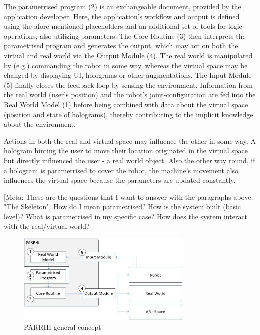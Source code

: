 The parametrised program (2) is an exchangeable document, provided by the application developer. Here, the application's workflow and output is defined using the afore mentioned placeholders and an additional set of tools for logic operations, also utilizing parameters. The Core Routine (3) then interprets the parametrised program and generates the output, which may act on both the virtual and real world via the Output Module (4). The real world is manipulated by (e.g.) commanding the robot in some way, whereas the virtual space may be changed by displaying UI, holograms or other augmentations. The Input Module (5) finally closes the feedback loop by sensing the environment. Information from the real world (user's position) and the robot's joint-configuration are fed into the Real World Model (1) before being combined with data about the virtual space (position and state of holograms), thereby contributing to the implicit knowledge about the environment.

Actions in both the real and virtual space may influence the other in some way. A hologram hinting the user to move their location originated in the virtual space but directly influenced the user - a real world object. Also the other way round, if a hologram is parametrised to cover the robot, the machine's movement also influences the virtual space because the parameters are updated constantly.



[Meta: These are the questions that I want to answer with the paragraphs above. "The Skeleton"]
How do I mean parametrised?
How is the system built (basic level)?
What is parametrised in my specific case?
How does the system interact with the real/virtual world?

\begin{figure}[h]
	\centering
	\includegraphics[width=0.75\textwidth]{Figures/PARRHIConcept03.jpg}
	\caption{PARRHI general concept}
	\label{Fig:PARRHIConcept}
\end{figure}


